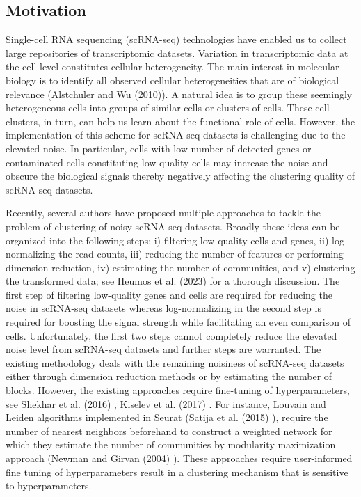\documentclass[11pt]{article}
\begin{document}
\subsection{Motivation}
Single-cell RNA sequencing (scRNA-seq) technologies have enabled us to collect large repositories of transcriptomic datasets. Variation in transcriptomic data at the cell level constitutes cellular heterogeneity. The main interest in molecular biology is to identify all observed cellular heterogeneities that are of biological relevance (Alstchuler and Wu (2010)\cite{altschuler2010}). A natural idea is to group these seemingly heterogeneous cells into groups of similar cells or clusters of cells. These cell clusters, in turn, can help us learn about the functional role of cells. However, the implementation of this scheme for scRNA-seq datasets is challenging due to the elevated noise. In particular, cells with low number of detected genes or contaminated cells constituting low-quality cells may increase the noise and obscure the biological signals thereby negatively affecting the clustering quality of scRNA-seq datasets.

Recently, several authors have proposed multiple approaches to tackle the problem of clustering of noisy scRNA-seq datasets. Broadly these ideas can be organized into the following steps:
i) filtering low-quality cells and genes, ii) log-normalizing the read counts, iii) reducing the number of features or performing dimension reduction, iv) estimating the number of communities, and v) clustering the transformed data; see Heumos et al. (2023) \cite{heumos2023} for a thorough discussion. The first step of filtering low-quality genes and cells are required for reducing the noise in scRNA-seq datasets whereas log-normalizing in the second step is required for boosting the signal strength while facilitating an even comparison of cells. Unfortunately, the first two steps cannot completely reduce the elevated noise level from scRNA-seq datasets and further steps are warranted. The existing methodology deals with the remaining noisiness of scRNA-seq datasets either through dimension reduction methods or by estimating the number of blocks. However, the existing approaches require fine-tuning of hyperparameters, see Shekhar et al. (2016) \cite{shekhar2016}, Kiselev et al. (2017) \cite{kiselev2017}. For instance, Louvain and Leiden algorithms implemented in Seurat (Satija et al. (2015) \cite{satija2015}), require the number of nearest neighbors beforehand to construct a weighted network for which they estimate the number of communities by modularity maximization approach (Newman and Girvan (2004) \cite{newman04}). These approaches require user-informed fine tuning of hyperparameters result in a clustering mechanism that is sensitive to hyperparameters.
\end{document}
